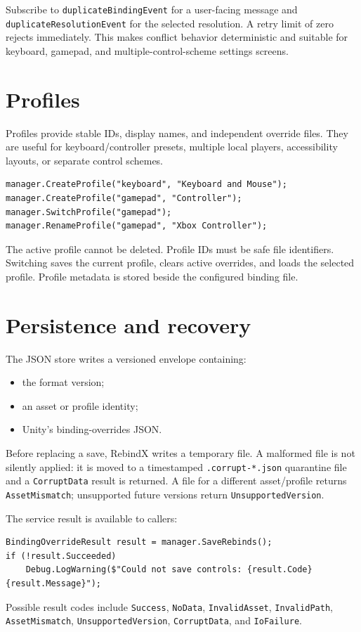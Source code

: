 \documentclass[11pt,a4paper]{article}
\newcommand{\class}[1]{\texttt{#1}}
\newcommand{\pathref}[1]{\texttt{#1}}
\begin{document}
Subscribe to \class{duplicateBindingEvent} for a user-facing message and \class{duplicateResolutionEvent} for the selected resolution. A retry limit of zero rejects immediately. This makes conflict behavior deterministic and suitable for keyboard, gamepad, and multiple-control-scheme settings screens.

\section{Profiles}
Profiles provide stable IDs, display names, and independent override files. They are useful for keyboard/controller presets, multiple local players, accessibility layouts, or separate control schemes.
\begin{lstlisting}[style=csharp]
manager.CreateProfile("keyboard", "Keyboard and Mouse");
manager.CreateProfile("gamepad", "Controller");
manager.SwitchProfile("gamepad");
manager.RenameProfile("gamepad", "Xbox Controller");
\end{lstlisting}
The active profile cannot be deleted. Profile IDs must be safe file identifiers. Switching saves the current profile, clears active overrides, and loads the selected profile. Profile metadata is stored beside the configured binding file.

\section{Persistence and recovery}
The JSON store writes a versioned envelope containing:
\begin{itemize}
  \item the format version;
  \item an asset or profile identity;
  \item Unity's binding-overrides JSON.
\end{itemize}
Before replacing a save, RebindX writes a temporary file. A malformed file is not silently applied: it is moved to a timestamped \pathref{.corrupt-*.json} quarantine file and a \class{CorruptData} result is returned. A file for a different asset/profile returns \class{AssetMismatch}; unsupported future versions return \class{UnsupportedVersion}.

The service result is available to callers:
\begin{lstlisting}[style=csharp]
BindingOverrideResult result = manager.SaveRebinds();
if (!result.Succeeded)
    Debug.LogWarning($"Could not save controls: {result.Code} {result.Message}");
\end{lstlisting}
Possible result codes include \class{Success}, \class{NoData}, \class{InvalidAsset}, \class{InvalidPath}, \class{AssetMismatch}, \class{UnsupportedVersion}, \class{CorruptData}, and \class{IoFailure}.
\end{document}
